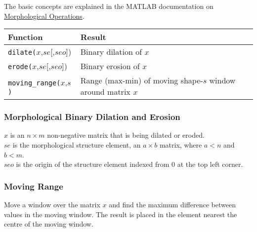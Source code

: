   \par The basic concepts are explained in the MATLAB documentation on 
  \href{http://www.mathworks.com/access/helpdesk/help/toolbox/images/morph.html}{ Morphological Operations}.

  \begin{tabular}{|l|l|}
    \hline 
      \textbf{Function} & \textbf{Result}
    \\
      \hline 
      \hline 
        \texttt{dilate(}$x$,$se$[,$seo$]) & Binary dilation of $x$
      \\
      \hline 
        \texttt{erode(}$x$,$se$[,$seo$]) & Binary erosion of $x$
      \\
      \hline 
        \texttt{moving\_range(}$x$,$s$\texttt{)} & Range (max-min) of moving shape-$s$ window around matrix $x$
      \\
  \hline
\end{tabular}

  \subsubsection{
    \label{Dilation-and-Erosion}Morphological Binary Dilation and Erosion
  }

  $x$ is an $n\times m$ non-negative matrix that is being dilated or eroded.
  \\
  $se$ is the morphological structure element, an $a\times b$ matrix, where $a<n$ and $b<m$.
  \\
  $seo$ is the origin of the structure element indexed from 0 at the top left corner.
  \\
  \subsubsection{
    \label{Moving-Range}Moving Range
  }

  \par Move a window over the matrix 
  $x$ and find the maximum difference between values in the
  moving window. The result is placed in the element nearest the centre
  of the moving window.
